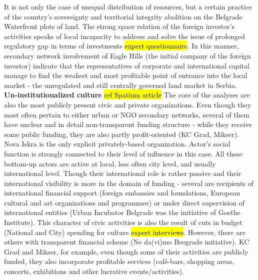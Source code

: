 \documentclass[11pt]{report}
\begin{document}
It is not only the case of unequal distribution of resources, but a certain practice of the country's sovereignty and territorial integrity abolition on the Belgrade Waterfront plots of land.
The strong space relation of the foreign investor's activities speaks of local incapacity to address and solve the issue of prolonged regulatory gap in terms of investments \hl{expert questionnaire}. In this manner, secondary network involvement of Eagle Hills (the initial company of the foreign investor) indicate that the representatives of corporate and international capital manage to find the weakest and most profitable point of entrance into the local market - the unregulated and still centrally governed land market in Serbia.
\\
\textbf{Un-institutionalized culture} \hl{ref Spatium article}
The core of the analyses are also the most publicly present civic and private organizations. Even though they most often pertain to either urban or NGO secondary networks, several of them have unclear and in detail non-transparent funding structure - while they receive some public funding, they are also partly profit-oriented (KC Grad, Mikser). Nova Iskra is the only explicit privately-based organization. Actor’s social function is strongly connected to their level of influence in this case. All these bottom-up actors are active at local, less often city level, and usually international level. Though their international role is rather passive and their international visibility is more in the domain of funding - several are recipients of international financial support (foreign embassies and foundations, European cultural and art organizations and programmes) or under direct supervision of international entities (Urban Incubator Belgrade was the initiative of Goethe Institute).
This character of civic activities is also the result of cuts in budget (National and City) spending for culture \hl{expert interviews}.
However, there are others with transparent financial scheme (Ne da(vi)mo Beograde initiative). KC Grad and Mikser, for example, even though some of their activities are publicly funded, they also incorporate profitable services (café-bars, shopping areas, concerts, exhibitions and other lucrative events/activities).
\end{document}

